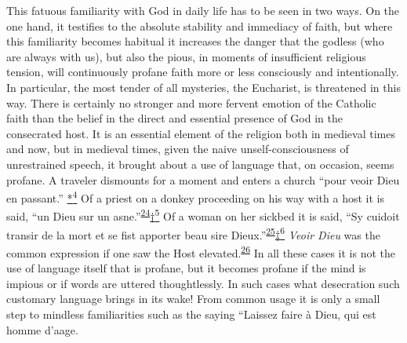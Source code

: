 This fatuous familiarity with God in daily life has to be seen in two
ways. On the one hand, it testifies to the absolute stability and
immediacy of faith, but where this familiarity becomes habitual it
increases the danger that the godless (who are always with us), but also
the pious, in moments of insufficient religious tension, will
continuously profane faith more or less consciously and intentionally.
In particular, the most tender of all mysteries, the Eucharist, is
threatened in this way. There is certainly no stronger and more fervent
emotion of the Catholic faith than the belief in the direct and
essential presence of God in the consecrated host. It is an essential
element of the religion both in medieval times and now, but in medieval
times, given the naive unself-consciousness of unrestrained speech, it
brought about a use of language that, on occasion, seems profane. A
traveler dismounts for a moment and enters a church ``pour veoir Dieu en
passant.''
\protect\hypertarget{13_Chapter_Six__THE_DEPICTION_OF_TH.xhtmlux5cux23id_2995}{\protect\hyperlink{23_NOTES.xhtmlux5cux23id_2996}{*\textsuperscript{4}}}
Of a priest on a donkey proceeding on his way with a host it is said,
``un Dieu sur un
asne.''\textsuperscript{\protect\hypertarget{13_Chapter_Six__THE_DEPICTION_OF_TH.xhtmlux5cux23id_1223}{\protect\hyperlink{23_NOTES.xhtmlux5cux23id_1224}{24}}}\protect\hypertarget{13_Chapter_Six__THE_DEPICTION_OF_TH.xhtmlux5cux23id_2997}{\protect\hyperlink{23_NOTES.xhtmlux5cux23id_2998}{†\textsuperscript{5}}}
Of a woman on her sickbed it is said, ``Sy cuidoit transir de la mort et
se fist apporter beau sire
Dieux.''\textsuperscript{\protect\hypertarget{13_Chapter_Six__THE_DEPICTION_OF_TH.xhtmlux5cux23id_1221}{\protect\hyperlink{23_NOTES.xhtmlux5cux23id_1222}{25}}}\protect\hypertarget{13_Chapter_Six__THE_DEPICTION_OF_TH.xhtmlux5cux23id_2999}{\protect\hyperlink{23_NOTES.xhtmlux5cux23id_3000}{‡\textsuperscript{6}}}
\emph{Veoir Dieu} was the common expression if one saw the Host
elevated.\textsuperscript{\protect\hypertarget{13_Chapter_Six__THE_DEPICTION_OF_TH.xhtmlux5cux23id_1219}{\protect\hyperlink{23_NOTES.xhtmlux5cux23id_1220}{26}}}
In all these cases it is not the use of language itself that is profane,
but it becomes profane if the mind is impious or if words are uttered
thoughtlessly. In such cases what desecration such customary language
brings in its wake! From common usage it is only a small step to
mindless familiarities
\protect\hypertarget{13_Chapter_Six__THE_DEPICTION_OF_TH.xhtmlux5cux23page_179}{}{}such
as the saying ``Laissez faire à Dieu, qui est homme d'aage.
